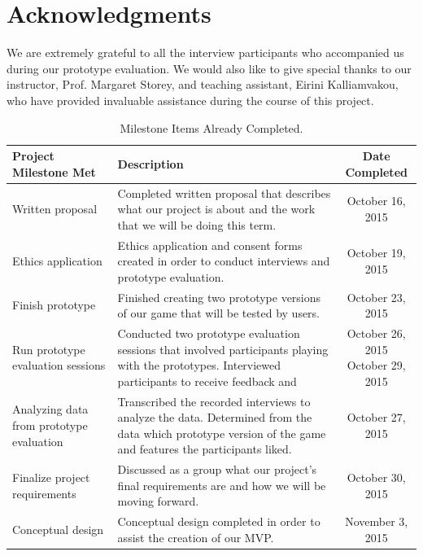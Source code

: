 \documentclass{sigchi}
\begin{document}
\section{Acknowledgments}

We are extremely grateful to all the interview participants who accompanied us during our prototype evaluation. We would also like to give special thanks to our instructor, Prof. Margaret Storey, and teaching assistant, Eirini Kalliamvakou, who have provided invaluable assistance during the course of this project.

\nocite{*}



\onecolumn
{}\label{apx:completed}

\begin{table}[h!]
\centering
\begin{tabular}{>{\raggedright}p{4cm}|>{\raggedright}p{6cm}|c}

\textbf{Project Milestone Met} &
\textbf{Description} &
\textbf{Date Completed} \\ \hline \hline

Written proposal &
Completed written proposal that describes what our project is about and the work that we will be doing this term. &
October 16, 2015 \\ \hline

Ethics application &
Ethics application and consent forms created in order to conduct interviews and prototype evaluation. &
October 19, 2015 \\ \hline

Finish prototype &
Finished creating two prototype versions of our game that will be tested by users. &
October 23, 2015 \\ \hline

Run prototype evaluation sessions &
Conducted two prototype evaluation sessions that involved participants playing with the prototypes. Interviewed participants to receive feedback and &
\makecell{October 26, 2015 \\ October 29, 2015} \\ \hline 

Analyzing data from prototype evaluation &
Transcribed the recorded interviews to analyze the data. Determined from the data which prototype version of the game and features the participants liked. &
October 27, 2015 \\ \hline

Finalize project requirements &
Discussed as a group what our project’s final requirements are and how we will be moving forward. &
October 30, 2015 \\ \hline

Conceptual design &
Conceptual design completed in order to assist the creation of our MVP. &
November 3, 2015 \\ \hline

\end{tabular}
\caption{Milestone Items Already Completed.}
\label{tab:met}
\end{table}
\end{document}
